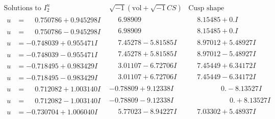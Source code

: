 \documentclass[1p]{elsarticle_modified}
\theoremstyle{definition}
\newcommand{\I}{\sqrt{-1}}
\begin{document}
$$\begin{array}{c|c|c}
 \end{array}$$\newpage$$\begin{array}{c|c|c}  
\text{Solutions to }I^u_{2}& \I (\text{vol} + \sqrt{-1}CS) & \text{Cusp shape}\\
 \hline 
\begin{aligned}
u &= \phantom{-}0.750786 + 0.945298 I\end{aligned}
 & \phantom{-}6.98909\phantom{ +0.000000I} & \phantom{-}8.15485 + 0. I\phantom{ +0.000000I} \\ \hline\begin{aligned}
u &= \phantom{-}0.750786 - 0.945298 I\end{aligned}
 & \phantom{-}6.98909\phantom{ +0.000000I} & \phantom{-}8.15485 + 0. I\phantom{ +0.000000I} \\ \hline\begin{aligned}
u &= -0.748039 + 0.955471 I\end{aligned}
 & \phantom{-}7.45278 - 5.81585 I & \phantom{-}8.97012 + 5.48927 I \\ \hline\begin{aligned}
u &= -0.748039 - 0.955471 I\end{aligned}
 & \phantom{-}7.45278 + 5.81585 I & \phantom{-}8.97012 - 5.48927 I \\ \hline\begin{aligned}
u &= -0.718495 + 0.983429 I\end{aligned}
 & \phantom{-}3.01107 - 6.72706 I & \phantom{-}7.45449 + 6.34172 I \\ \hline\begin{aligned}
u &= -0.718495 - 0.983429 I\end{aligned}
 & \phantom{-}3.01107 + 6.72706 I & \phantom{-}7.45449 - 6.34172 I \\ \hline\begin{aligned}
u &= \phantom{-}0.712082 + 1.003140 I\end{aligned}
 & -0.78809 + 9.12338 I & \phantom{-0.000000 } 0. - 8.13527 I \\ \hline\begin{aligned}
u &= \phantom{-}0.712082 - 1.003140 I\end{aligned}
 & -0.78809 - 9.12338 I & \phantom{-0.000000 -}0. + 8.13527 I \\ \hline\begin{aligned}
u &= -0.730704 + 1.006040 I\end{aligned}
 & \phantom{-}5.77023 - 8.94227 I & \phantom{-}7.03302 + 5.48937 I \\ \hline\begin{aligned}

\end{aligned}
\end{array}$$
\end{document}
